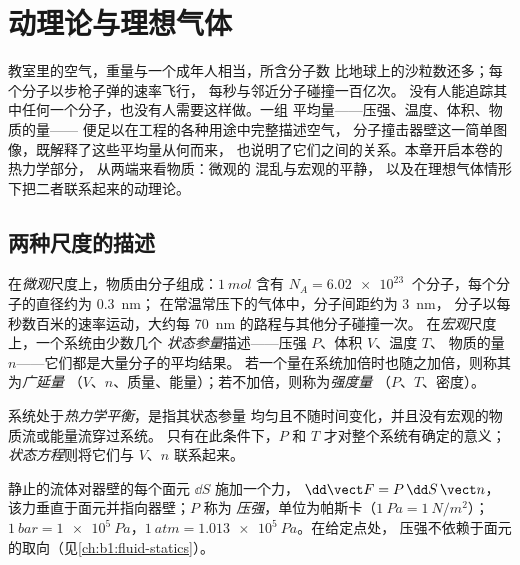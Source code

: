\chapter{动理论与理想气体}\label{ch:b1:kinetic-theory}

教室里的空气，重量与一个成年人相当，所含分子数
比地球上的沙粒数还多；每个分子以步枪子弹的速率飞行，
每秒与邻近分子碰撞一百亿次。
没有人能追踪其中任何一个分子，也没有人需要这样做。一组
平均量——压强、温度、体积、物质的量——
便足以在工程的各种用途中完整描述空气，
分子撞击器壁这一简单图像，既解释了这些平均量从何而来，
也说明了它们之间的关系。本章开启本卷的热力学部分，
从两端来看物质：微观的
混乱与宏观的平静，
以及在理想气体情形下把二者联系起来的动理论。

\section{两种尺度的描述}

\begin{definition}[微观尺度与宏观尺度]\label{def:b1:kinetic-theory:scales}
在\emph{微观}尺度上，物质由分子组成：$\qty{1}{mol}$
含有 $N_A = \qty{6.02e23}{}$ 个分子，每个分子的直径约为 \qty{0.3}{nm}；
在常温常压下的气体中，分子间距约为 \qty{3}{nm}，
分子以每秒数百米的速率运动，大约每 \qty{70}{nm} 的路程与其他分子碰撞一次。
在\emph{宏观}尺度上，一个系统由少数几个
\emph{状态参量}描述——压强 $P$、体积 $V$、温度 $T$、
物质的量 $n$——它们都是大量分子的平均结果。
若一个量在系统加倍时也随之加倍，则称其为\emph{广延量}
（$V$、$n$、质量、能量）；若不加倍，则称为\emph{强度量}
（$P$、$T$、密度）。
\end{definition}

\begin{definition}[热力学平衡]\label{def:b1:kinetic-theory:equilibrium}
系统处于\emph{热力学平衡}，是指其状态参量
均匀且不随时间变化，并且没有宏观的物质流或能量流穿过系统。
只有在此条件下，$P$ 和 $T$ 才对整个系统有确定的意义；
\emph{状态方程}则将它们与 $V$、$n$ 联系起来。
\end{definition}

\begin{definition}[压强]\label{def:b1:kinetic-theory:pressure}
静止的流体对器壁的每个面元 $\dd S$ 施加一个力，
$\dd\vect F = P\,\dd S\,\vect n$，该力垂直于面元并指向器壁；$P$ 称为
\emph{压强}，单位为帕斯卡（$\qty{1}{Pa} = \qty{1}{N/m^2}$）；$\qty{1}{bar}
= \qty{1e5}{Pa}$，$\qty{1}{atm} = \qty{1.013e5}{Pa}$。在给定点处，
压强不依赖于面元的取向（见\cref{ch:b1:fluid-statics}）。
\end{definition}

